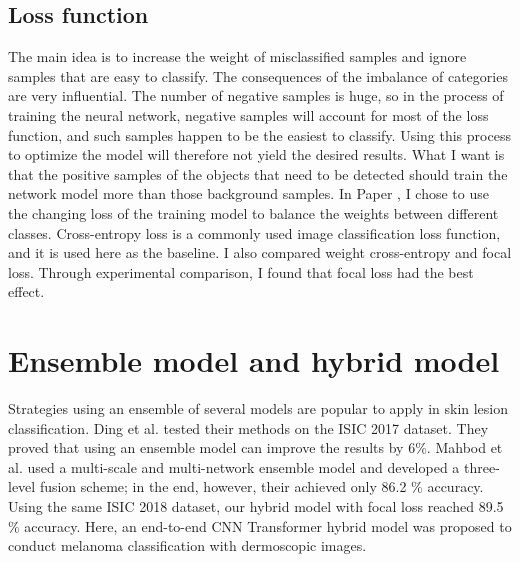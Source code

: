  \subsection{Loss function}
 The main idea is to increase the weight of misclassified samples and ignore samples that are easy to classify. The consequences of the imbalance of categories are very influential. The number of negative samples is huge, so in the process of training the neural network, negative samples will account for most of the loss function, and such samples happen to be the easiest to classify. Using this process to optimize the model will therefore not yield the desired results. What I want is that the positive samples of the objects that need to be detected should train the network model more than those background samples.  In Paper \uppercase\expandafter{}, I chose to use the changing loss of the training model to balance the weights between different classes. Cross-entropy loss is a commonly used image classification loss function, and it is used here as the baseline. I also compared weight cross-entropy and focal loss. Through experimental comparison, I found that focal loss had the best effect.





\section{Ensemble model and hybrid model}


Strategies using an ensemble of several models\cite{guergueb2022skin,rahman2021approach,ding2022two,kausar2021multiclass,shorfuzzaman2022explainable,mahbod2020transfer} are popular to apply in skin lesion classification. Ding et al. \cite{ding2022two} tested their methods on the ISIC 2017 dataset. They proved that using an ensemble model can improve the results by 6$\%$.   Mahbod et al. \cite{mahbod2020transfer} used a multi-scale and multi-network ensemble model and developed a three-level fusion scheme; in the end, however, their achieved only 86.2 $\%$ accuracy. Using the same ISIC 2018 dataset, our hybrid model with focal loss reached 89.5$\%$ accuracy. Here, an end-to-end CNN Transformer hybrid model was proposed to conduct melanoma classification with dermoscopic images.

